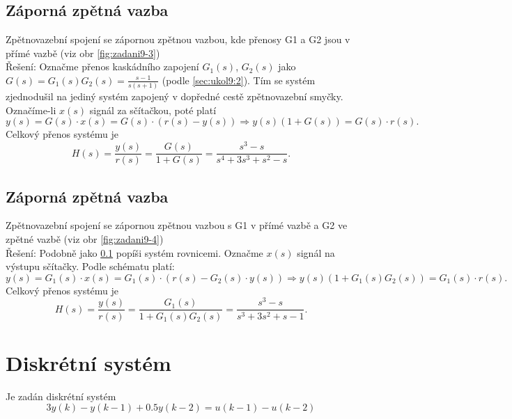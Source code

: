 \documentclass[twoside]{article}
\begin{document}
\subsection{Záporná zpětná vazba } 
\label{sec:ukol9:3}
Zpětnovazební spojení se zápornou zpětnou vazbou, kde přenosy G1 a G2 jsou v přímé vazbě (viz obr \ref{fig:zadani9-3}) \\
Řešení: Označme přenos kaskádního zapojení $G_1(s)$, $G_2(s)$ jako $G(s) = G_1(s)G_2(s) = \frac{s-1}{s(s+1)}$ (podle \ref{sec:ukol9:2}).
Tím se systém zjednodušil na jediný systém zapojený v dopředné cestě zpětnovazební smyčky. Označíme-li $x(s)$ signál za sčítačkou, poté platí
\begin{equation*}
	y(s) = G(s) \cdot x(s) = G(s) \cdot (r(s) - y(s)) \Rightarrow y(s) (1 + G(s)) = G(s) \cdot r(s).
\end{equation*}
Celkový přenos systému je
\begin{equation*}
	H(s) = \frac{y(s)}{r(s)} = \frac{G(s)}{1 + G(s)} = \frac{s^3 - s}{s^4 + 3s^3 + s^2 - s}.
\end{equation*}
\subsection{Záporná zpětná vazba } 
Zpětnovazební spojení se zápornou zpětnou vazbou s G1 v přímé vazbě a G2 ve zpětné vazbě (viz obr \ref{fig:zadani9-4}) \\
Řešení: Podobně jako \ref{sec:ukol9:3} popíši systém rovnicemi. Označme $x(s)$ signál na výstupu sčítačky. Podle schématu platí:
\begin{equation*}
	y(s) = G_1(s) \cdot x(s) = G_1(s) \cdot (r(s) - G_2(s) \cdot y(s)) \Rightarrow y(s) (1 + G_1(s)G_2(s)) = G_1(s) \cdot r(s).
\end{equation*}
Celkový přenos systému je
\begin{equation*}
	H(s) = \frac{y(s)}{r(s)} = \frac{G_1(s)}{1 + G_1(s)G_2(s)} = \frac{s^3 - s}{s^3 + 3s^2 +s - 1}.
\end{equation*}
\section{Diskrétní systém}
\label{sec:ukol10}
Je zadán diskrétní systém
\begin{equation}
	\label{eq:diferencni}
	3y(k) - y(k-1) + 0.5 y(k-2) = u(k-1)-u(k-2)
\end{equation}
\end{document}
